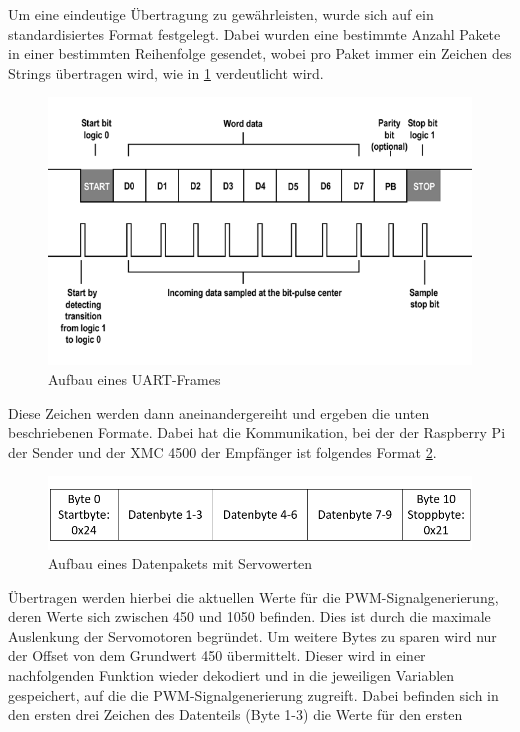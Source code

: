 \documentclass[12pt,a4paper,bibliography=totoc,listof=totoc]{scrartcl}
\begin{document}
Um eine eindeutige Übertragung zu gewährleisten, wurde sich auf ein standardisiertes Format festgelegt. 
Dabei wurden eine bestimmte Anzahl Pakete in einer bestimmten Reihenfolge gesendet, wobei pro Paket immer 
ein Zeichen des Strings übertragen wird, wie in \ref{fig:UARTFrame} \cite {electricimp} verdeutlicht wird.
\begin{figure}[htbp]
	\centering
	\includegraphics[scale = 0.5]{pics/Uartframe}
	\caption{Aufbau eines UART-Frames}
	\label{fig:UARTFrame}
\end{figure}
Diese Zeichen werden dann aneinandergereiht und ergeben die unten beschriebenen Formate. Dabei hat die 
Kommunikation, bei der der Raspberry Pi der Sender und der XMC 4500 der Empfänger ist folgendes Format 
\ref{fig:UART Servo}.
\begin{figure}[htbp]
	\centering
	\includegraphics[scale = 0.5]{pics/Uartservo}
	\caption{Aufbau eines Datenpakets mit Servowerten}
	\label{fig:UART Servo}
\end{figure}
Übertragen werden hierbei die aktuellen Werte für die PWM-Signalgenerierung, deren Werte sich zwischen 
450 und 1050 befinden. Dies ist durch die maximale Auslenkung der Servomotoren begründet. Um weitere Bytes 
zu sparen wird nur der Offset von dem Grundwert 450 übermittelt. Dieser wird in einer nachfolgenden 
Funktion wieder dekodiert und in die jeweiligen Variablen gespeichert, auf die die PWM-Signalgenerierung 
zugreift. Dabei befinden sich in den ersten drei Zeichen des Datenteils (Byte 1-3) die Werte für den ersten 
\end{document}
